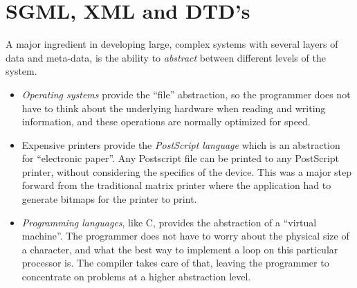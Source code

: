 
\chapter{SGML, XML and DTD's}
\label{cha:sgml-xml-and-dtd's}



A major ingredient in developing large, complex systems with several
layers of data and meta-data, is the ability to \textit{abstract}
between different levels of the system.

\begin{itemize}
\item
  
  \textit{Operating systems} provide the ``file'' abstraction, so the
  programmer does not have to think about the underlying hardware when
  reading and writing information, and these operations are normally
  optimized for speed.

\item
  
  Expensive printers provide the \textit{PostScript language} which is
  an abstraction for ``electronic paper''.  Any Postscript file can be
  printed to any PostScript printer, without considering the specifics
  of the device.  This was a major step forward from the traditional
  matrix printer where the application had to generate bitmaps for the
  printer to print.
  
\item
  
  \textit{Programming languages}, like C, provides the abstraction of
  a ``virtual machine''.  The programmer does not have to worry about
  the physical size of a character, and what the best way to implement
  a loop on this particular processor is.  The compiler takes care of
  that, leaving the programmer to concentrate on problems at a higher
  abstraction level.
  
\end{itemize}



